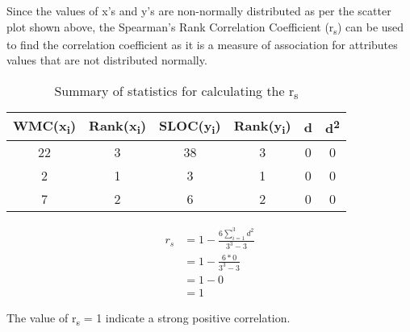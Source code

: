 Since the values of x's and y's are non-normally distributed as per the scatter plot shown above, the Spearman's Rank Correlation Coefficient (r\textsubscript{s}) can be used to find the correlation coefficient as it is a measure of association for attributes values that are not distributed normally.

\vspace{12pt}
\begin{table}[!htb]
\centering
\begin{tabular}{|c|c|c|c|c|c|}
\hline
\textbf{WMC(x\textsubscript{i})} & \textbf{Rank(x\textsubscript{i})} & \textbf{SLOC(y\textsubscript{i})} & \textbf{Rank(y\textsubscript{i})} & \textbf{d} & \textbf{d\textsuperscript{2}} \\
\hline
  22    & 3     & 38    & 3     & 0     & 0  \\
  2     & 1     & 3     & 1     & 0     & 0  \\
  7     & 2     & 6     & 2     & 0     & 0  \\
\hline
\end{tabular}
\caption{Summary of statistics for calculating the r\textsubscript{s}}
\end{table}

\begin{align}
    r_s     &= 1 - \frac{6\sum_{i=1}^{3}d^2}{3^3 - 3} \\  
            &= 1 - \frac{6 * 0}{3^3 - 3} \\        
            &= 1 - 0 \\
            &= 1
\end{align}

The value of r\textsubscript{s} = 1 indicate a strong positive correlation. 
\pagebreak